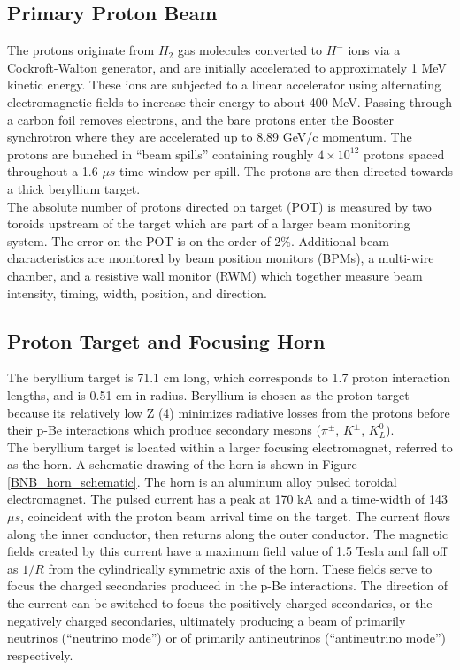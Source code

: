 \subsection{Primary Proton Beam}
The protons originate from $H_2$ gas molecules converted to $H^-$ ions via a Cockroft-Walton generator, and are initially accelerated to approximately 1 MeV kinetic energy. These ions are subjected to a linear accelerator using alternating electromagnetic fields to increase their energy to about 400 MeV. Passing through a carbon foil removes electrons, and the bare protons enter the Booster synchrotron where they are accelerated up to 8.89 GeV/c momentum. The protons are bunched in ``beam spills'' containing roughly $4\times10^{12}$ protons spaced throughout a 1.6 $\mu s$ time window per spill. The protons are then directed towards a thick beryllium target.\\

The absolute number of protons directed on target (POT) is measured by two toroids upstream of the target which are part of a larger beam monitoring system. The error on the POT is on the order of 2\%. Additional beam characteristics are monitored by beam position monitors (BPMs), a multi-wire chamber, and a resistive wall monitor (RWM) which together measure beam intensity, timing, width, position, and direction.

\subsection{Proton Target and Focusing Horn}
The beryllium target is 71.1 cm long, which corresponds to 1.7 proton interaction lengths, and is 0.51 cm in radius. Beryllium is chosen as the proton target because its relatively low Z (4) minimizes radiative losses from the protons before their p-Be interactions which produce secondary mesons ($\pi^\pm$, $K^\pm$, $K^0_L$).\\

The beryllium target is located within a larger focusing electromagnet, referred to as the horn. A schematic drawing of the horn is shown in Figure \ref{BNB_horn_schematic}. The horn is an aluminum alloy pulsed toroidal electromagnet. The pulsed current has a peak at 170 kA and a time-width of 143 $\mu s$, coincident with the proton beam arrival time on the target. The current flows along the inner conductor, then returns along the outer conductor. The magnetic fields created by this current have a maximum field value of 1.5 Tesla and fall off as $1/R$ from the cylindrically symmetric axis of the horn. These fields serve to focus the charged secondaries produced in the p-Be interactions. The direction of the current can be switched to focus the positively charged secondaries, or the negatively charged secondaries, ultimately producing a beam of primarily neutrinos (``neutrino mode'') or of primarily antineutrinos (``antineutrino mode'') respectively.\\

